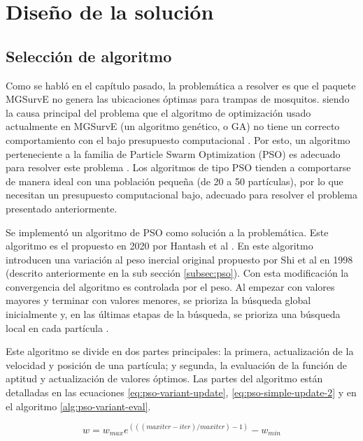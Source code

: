 \documentclass[letterpaper]{report}
\begin{document}
  \section{Diseño de la solución}
    \subsection{Selección de algoritmo}
    Como se habló en el capítulo pasado, la problemática a resolver es que el
    paquete MGSurvE no genera las ubicaciones óptimas para trampas de mosquitos.
    siendo la causa principal del
    problema que el algoritmo de optimización usado actualmente en MGSurvE
    (un algoritmo genético, o GA) no tiene un correcto comportamiento con el
    bajo presupuesto computacional \cite{SwarmVsEvol}. Por esto, un algoritmo
    perteneciente a
    la familia de Particle Swarm Optimization (PSO) es adecuado para resolver
    este problema \cite{SwarmVsEvol,PSOPopulationSize}. Los algoritmos de tipo
    PSO tienden a comportarse de manera ideal con una población pequeña (de 20
    a 50 partículas), por lo que necesitan un presupuesto computacional bajo,
    adecuado para resolver el problema presentado anteriormente.

    Se implementó un algoritmo de PSO como solución a la problemática. Este
    algoritmo es el propuesto
    en 2020 por Hantash et al \cite{PSOEnergy}. En este algoritmo introducen una
    variación al peso inercial original propuesto por Shi et al \cite{CPSO} en
    1998 (descrito anteriormente en la sub sección \ref{subsec:pso}). Con esta
    modificación la convergencia del algoritmo es controlada por el peso. Al 
    empezar con valores mayores y terminar con valores menores, se prioriza la
    búsqueda global inicialmente y, en las últimas etapas de la búsqueda, se
    prioriza una búsqueda local en cada partícula \cite{CPSO}.

    Este algoritmo se divide en dos
    partes principales: la primera, actualización de la velocidad y posición de
    una partícula; y segunda, la evaluación de la función de aptitud y
    actualización de valores óptimos. Las partes del algoritmo están detalladas
    en las ecuaciones \ref{eq:pso-variant-update}, \ref{eq:pso-simple-update-2}
    y en el algoritmo \ref{alg:pso-variant-eval}.

    \begin{equation}
      \label{eq:pso-weight-update}
      w = w_{max} e^{(((maxiter - iter) / maxiter) - 1)} - w_{min} 
    \end{equation}
\end{document}
